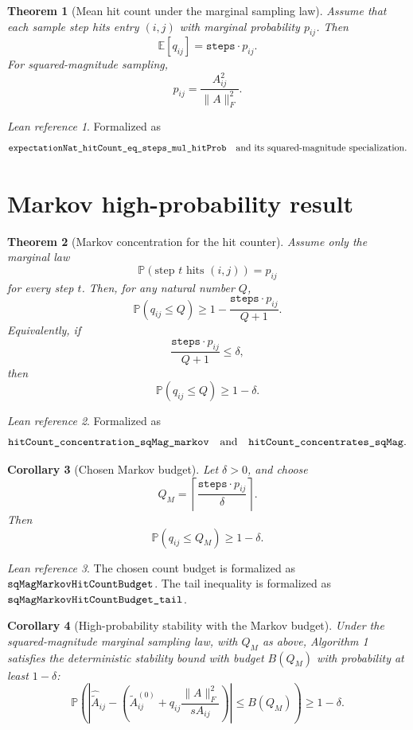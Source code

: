 \documentclass[11pt]{article}
\newcommand{\Frob}[1]{\lVert #1\rVert_F}
\newcommand{\Prob}{\mathbb{P}}
\newcommand{\E}{\mathbb{E}}
\newcommand{\lean}[1]{\texttt{\detokenize{#1}}}
\newtheorem{theorem}{Theorem}
\newtheorem{corollary}[theorem]{Corollary}
\theoremstyle{definition}
\theoremstyle{remark}
\newtheorem*{leanref}{Lean reference}
\begin{document}
\begin{theorem}[Mean hit count under the marginal sampling law]
Assume that each sample step hits entry \((i,j)\) with marginal probability
\(p_{ij}\). Then
\[
  \E[q_{ij}] = \texttt{steps}\cdot p_{ij}.
\]
For squared-magnitude sampling,
\[
  p_{ij} = \frac{A_{ij}^2}{\Frob{A}^2}.
\]
\end{theorem}

\begin{leanref}
Formalized as
\[
  \lean{expectationNat_hitCount_eq_steps_mul_hitProb}
  \quad\text{and its squared-magnitude specialization.}
\]
\end{leanref}

\section*{Markov high-probability result}

\begin{theorem}[Markov concentration for the hit counter]
Assume only the marginal law
\[
  \Prob(\text{step } t \text{ hits } (i,j)) = p_{ij}
\]
for every step \(t\). Then, for any natural number \(Q\),
\[
  \Prob(q_{ij} \le Q)
  \ge
  1 - \frac{\texttt{steps}\cdot p_{ij}}{Q+1}.
\]
Equivalently, if
\[
  \frac{\texttt{steps}\cdot p_{ij}}{Q+1} \le \delta,
\]
then
\[
  \Prob(q_{ij} \le Q) \ge 1-\delta.
\]
\end{theorem}

\begin{leanref}
Formalized as
\[
  \lean{hitCount_concentration_sqMag_markov}
  \quad\text{and}\quad
  \lean{hitCount_concentrates_sqMag}.
\]
\end{leanref}

\begin{corollary}[Chosen Markov budget]
Let \(\delta>0\), and choose
\[
  Q_M =
  \left\lceil
    \frac{\texttt{steps}\cdot p_{ij}}{\delta}
  \right\rceil.
\]
Then
\[
  \Prob(q_{ij} \le Q_M) \ge 1-\delta.
\]
\end{corollary}

\begin{leanref}
The chosen count budget is formalized as
\(\lean{sqMagMarkovHitCountBudget}\). The tail inequality is formalized as
\(\lean{sqMagMarkovHitCountBudget_tail}\).
\end{leanref}

\begin{corollary}[High-probability stability with the Markov budget]
Under the squared-magnitude marginal sampling law, with \(Q_M\) as above,
Algorithm 1 satisfies the deterministic stability bound with budget \(B(Q_M)\)
with probability at least \(1-\delta\):
\[
  \Prob\left(
    \left|
      \widehat{\widetilde A}_{ij}
      -
      \left(
        \widetilde A^{(0)}_{ij}
        +
        q_{ij}\frac{\Frob{A}^2}{s A_{ij}}
      \right)
    \right|
    \le B(Q_M)
  \right)
  \ge 1-\delta.
\]
\end{corollary}
\end{document}
